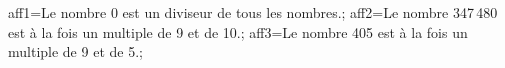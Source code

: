 \documentclass[exercice]{thedocument}%
\begin{document}
%
\>aff1=Le nombre 0 est un diviseur de tous les nombres.;%
\>aff2=Le nombre 347\,480 est à la fois un multiple de 9 et de 10.;%
\>aff3=Le nombre 405 est à la fois un multiple de 9 et de 5.;%
%
\end{document}
